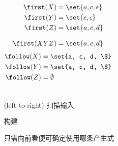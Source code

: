 \begin{frame}{}
  \begin{columns}
      
      \begin{align*}
        \first(X) &= \set{a, c, \epsilon} \\
        \first(Y) &= \set{c, \epsilon} \\
        \first(Z) &= \set{a, c, d} \\[8pt]
        \first(XYZ) &= \set{a, c, d}
      \end{align*}
      \begin{align*}
        \follow(X) &= \set{a, c, d, \$} \\
        \follow(Y) &= \set{a, c, d, \$} \\
        \follow(Z) &= \emptyset
      \end{align*}
  \end{columns}

  
\end{frame}

\begin{frame}{}
  \begin{center}
    {\large {}}

    \vspace{0.80cm}
    \begin{description}
      \setlength{\itemsep}{12pt}
      \item[$L:$]  (left-to-right) 扫描输入
      \item[$L:$] 构建
      \item[$1:$] 只需向前看便可确定使用哪条产生式
    \end{description}
  \end{center}
\end{frame}

\begin{frame}{}

  \begin{center}
  \end{center}
\end{frame}

\begin{frame}{}
  \begin{center}

    \vspace{0.60cm}
  \end{center}
\end{frame}

